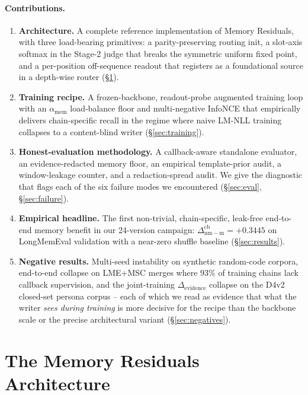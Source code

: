 \documentclass[11pt]{article}
\newcommand{\dnm}{\Delta_{\mathrm{nm{-}m}}}
\newcommand{\elift}{\Delta_{\mathrm{evidence}}}
\newcommand{\amem}{\alpha_{\mathrm{mem}}}
\begin{document}
\paragraph{Contributions.}
\begin{enumerate}\setlength{\itemsep}{2pt}
\item \textbf{Architecture.} A complete reference implementation of
Memory Residuals, with three load-bearing primitives: a
parity-preserving routing init, a slot-axis softmax in the Stage-2
judge that breaks the symmetric uniform fixed point, and a per-position
off-sequence readout that registers as a foundational source in a
depth-wise router (\S\ref{sec:arch}).
\item \textbf{Training recipe.} A frozen-backbone, readout-probe
augmented training loop with an $\amem$ load-balance floor and
multi-negative InfoNCE that empirically delivers chain-specific
recall in the regime where naive LM-NLL training collapses to a
content-blind writer (\S\ref{sec:training}).
\item \textbf{Honest-evaluation methodology.} A callback-aware
standalone evaluator, an evidence-redacted memory floor, an empirical
template-prior audit, a window-leakage counter, and a redaction-spread
audit. We give the diagnostic that flags each of the six failure modes
we encountered (\S\ref{sec:eval}, \S\ref{sec:failure}).
\item \textbf{Empirical headline.} The first non-trivial,
chain-specific, leak-free end-to-end memory benefit in our 24-version
campaign: $\dnm^{\mathrm{cb}}=+0.3445$ on LongMemEval validation
with a near-zero shuffle baseline (\S\ref{sec:results}).
\item \textbf{Negative results.} Multi-seed instability on synthetic
random-code corpora, end-to-end collapse on LME+MSC merges where
$93\%$ of training chains lack callback supervision, and the
joint-training $\elift$ collapse on the D4v2 closed-set persona
corpus -- each of which we read as evidence that what the writer
\emph{sees during training} is more decisive for the recipe than the
backbone scale or the precise architectural variant
(\S\ref{sec:negatives}).
\end{enumerate}

\section{The Memory Residuals Architecture}
\label{sec:arch}
\end{document}
